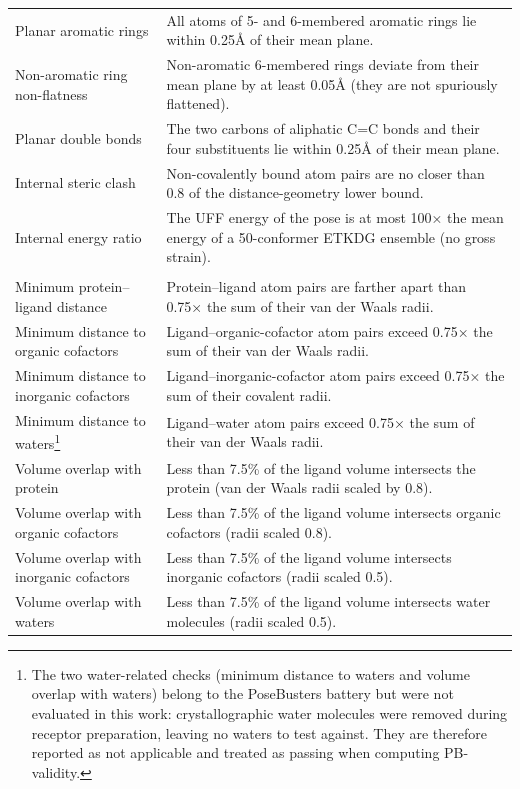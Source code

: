 \begin{longtable}[]{@{}
  >{\raggedright\arraybackslash}p{}
  >{\raggedright\arraybackslash}p{}@{}}
Planar aromatic rings & All atoms of 5- and 6-membered aromatic rings lie within 0.25Å of their mean plane. \\
Non-aromatic ring non-flatness & Non-aromatic 6-membered rings deviate from their mean plane by at least 0.05Å (they are not spuriously flattened). \\
Planar double bonds & The two carbons of aliphatic C=C bonds and their four substituents lie within 0.25Å of their mean plane. \\
Internal steric clash & Non-covalently bound atom pairs are no closer than 0.8 of the distance-geometry lower bound. \\
Internal energy ratio & The UFF energy of the pose is at most 100× the mean energy of a 50-conformer ETKDG ensemble (no gross strain). \\
\multicolumn{2}{@{}l@{}}{%
\textbf{Intermolecular validity (ligand versus receptor)}} \\
Minimum protein--ligand distance & Protein--ligand atom pairs are farther apart than 0.75× the sum of their van der Waals radii. \\
Minimum distance to organic cofactors & Ligand--organic-cofactor atom pairs exceed 0.75× the sum of their van der Waals radii. \\
Minimum distance to inorganic cofactors & Ligand--inorganic-cofactor atom pairs exceed 0.75× the sum of their covalent radii. \\
Minimum distance to waters\footnote{The two water-related checks (minimum distance to waters and volume overlap with waters) belong to the PoseBusters battery but were not evaluated in this work: crystallographic water molecules were removed during receptor preparation, leaving no waters to test against. They are therefore reported as not applicable and treated as passing when computing PB-validity.} & Ligand--water atom pairs exceed 0.75× the sum of their van der Waals radii. \\
Volume overlap with protein & Less than 7.5\% of the ligand volume intersects the protein (van der Waals radii scaled by 0.8). \\
Volume overlap with organic cofactors & Less than 7.5\% of the ligand volume intersects organic cofactors (radii scaled 0.8). \\
Volume overlap with inorganic cofactors & Less than 7.5\% of the ligand volume intersects inorganic cofactors (radii scaled 0.5). \\
Volume overlap with waters & Less than 7.5\% of the ligand volume intersects water molecules (radii scaled 0.5). \\
\end{longtable}

